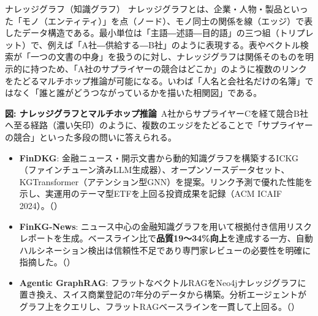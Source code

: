 \begin{concept}{ナレッジグラフ（知識グラフ）}
ナレッジグラフとは、企業・人物・製品といった「モノ（エンティティ）」を点（ノード）、モノ同士の関係を線（エッジ）で表したデータ構造である。最小単位は「主語―述語―目的語」の三つ組（トリプレット）で、例えば「A社―供給する―B社」のように表現する。表やベクトル検索が「一つの文書の中身」を扱うのに対し、ナレッジグラフは関係そのものを明示的に持つため、「A社のサプライヤーの競合はどこか」のように複数のリンクをたどるマルチホップ推論が可能になる。いわば「人名と会社名だけの名簿」ではなく「誰と誰がどうつながっているかを描いた相関図」である。
\begin{center}
\end{center}
{\small\color{brandgray}\textbf{図: ナレッジグラフとマルチホップ推論}\ A社からサプライヤーCを経て競合B社へ至る経路（濃い矢印）のように、複数のエッジをたどることで「サプライヤーの競合」といった多段の問いに答えられる。}
\end{concept}

\begin{itemize}
  \item \textbf{FinDKG}: 金融ニュース・開示文書から動的知識グラフを構築するICKG（ファインチューン済みLLM生成器）、オープンソースデータセット、KGTransformer（アテンション型GNN）を提案。リンク予測で優れた性能を示し、実運用のテーマ型ETFを上回る投資成果を記録（ACM ICAIF 2024）。（\cite{findkg2024}）
  \item \textbf{FinKG-News}: ニュース中心の金融知識グラフを用いて根拠付き信用リスクレポートを生成。ベースライン比で\textbf{品質19〜34\%向上}を達成する一方、自動ハルシネーション検出は信頼性不足であり専門家レビューの必要性を明確に指摘した。（\cite{creditrisk2026}）
  \item \textbf{Agentic GraphRAG}: フラットなベクトルRAGをNeo4jナレッジグラフに置き換え、スイス商業登記の7年分のデータから構築。分析エージェントがグラフ上をクエリし、フラットRAGベースラインを一貫して上回る。（\cite{agenticgraphrag2026}）
\end{itemize}

